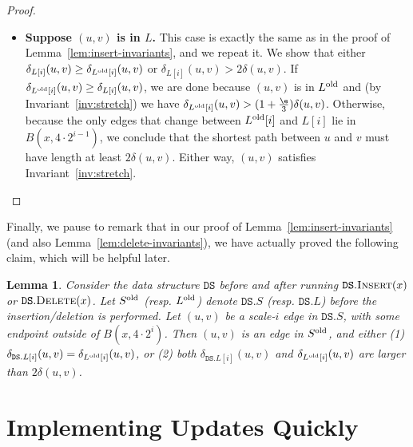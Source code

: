 \documentclass[11pt]{article}
\newtheorem{lemma}[theorem]{Lemma}
\newcommand{\cN}{\mathcal{N}}
\newcommand{\dist}{\ensuremath{\delta}}
\newcommand{\DS}{\texttt{DS}}
\newcommand{\sparse}{{\ensuremath{\DS.S}}}
\newcommand{\net}{{\ensuremath{\DS.\cN}}}
\newcommand{\light}{{\ensuremath{\DS.L}}}
\begin{document}
\begin{proof}
\begin{itemize}
        It remains to show that if $(u,v) \in S \setminus S^{\rm old}$ then $u,v \in B(x, 4 \cdot 2^i)$. Because $(u,v)$ is a scale-$i$ edge of $S$, the endpoints $u$ and $v$ belong to $\e 2^i$-net of the net-tree $\net$. In other words, letting $i' \coloneqq \log(\e 2^i)$, both $u$ and $v$ belong to the net $N_{i'}$. Moreover, because $(u,v)$ is not in $S^{\rm old}$, one endpoint (WLOG $u$) is $N_{i'}^{\rm old}$ but not $N_{i'}$. By Lemma~\ref{lem:net-delete-local}, we have $\dist(u,x) \le 2^{i'}$. By triangle inequality, $\dist(v,x) \le 2^{i'} + 2^i < 2 \cdot 2^i$. We conclude that $u,v \in B(x, 4 \cdot 2^i)$ as desired.
        \item \textbf{\boldmath Suppose $(u,v)$ is in $L$.} This case is exactly the same as in the proof of Lemma~\ref{lem:insert-invariants}, and we repeat it. We show that either $\dist_{L[i]}(u,v) \ge \dist_{L^{\rm old}[i]}(u,v)$ or $\dist_{L[i]}(u,v) > 2 \dist(u,v)$.
        If $\dist_{L^{\rm old}[i]}(u,v) \ge \dist_{L[i]}(u,v)$, we are done because $(u,v)$ is in $L^{\rm old}$ and (by Invariant~\ref{inv:stretch}) we have $\dist_{L^{\rm old}[i]}(u,v) > (1+ \frac \e 3) \dist(u,v)$. Otherwise, because the only edges that change between $L^{\rm old}[i]$ and $L[i]$ lie in $B(x,4 \cdot 2^{i-1})$, we conclude that the shortest path between $u$ and $v$ must have length at least $2 \dist(u,v)$. Either way, $(u,v)$ satisfies Invariant~\ref{inv:stretch}.
    \aftermath
        \end{itemize}
\end{proof}

% 

Finally, we pause to remark that in our proof of Lemma~\ref{lem:insert-invariants} (and also Lemma~\ref{lem:delete-invariants}), we have actually proved the following claim, which will be helpful later.
\begin{lemma}
\label{lem:dist-unchanged}
Consider the data structure $\DS$ before and after running $\DS.\textsc{Insert}(x)$ or $\DS.\textsc{Delete}(x)$. Let $S^{\rm old}$ (resp. $L^{\rm old}$) denote $\sparse$ (resp. $\light$) before the insertion/deletion is performed.
Let $(u,v)$ be a scale-$i$ edge in $\sparse$, with some endpoint outside of $B(x, 4\cdot 2^i)$. Then $(u,v)$ is an edge in $S^{\rm old}$, and either (1)
$\dist_{\light[i]}(u,v) = \dist_{L^{\rm old}[i]}(u,v)$, or (2) both $\dist_{\light[i]}(u,v)$ and $\dist_{L^{\rm old}[i]}(u,v)$ are larger than $2 \dist(u,v)$.
\end{lemma}


\section{Implementing Updates Quickly}
\label{S:distance-oracle}
\end{document}
